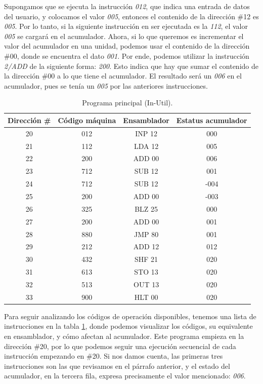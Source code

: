 \documentclass[letterpaper,12pt,oneside]{book}
\begin{document}
    Supongamos que se ejecuta la instrucción  \textit{012}, que indica una entrada de datos del usuario, y colocamos el valor \textit{005}, entonces
    el contenido de la dirección
	\#12 es \textit{005}. Por lo tanto, si la siguiente instrucción en ser ejecutada es la \textit{112}, el valor \textit{005} se cargará en el acumulador. 
	Ahora, si lo que queremos es incrementar el valor
	del acumulador en una unidad, podemos usar el contenido de la dirección \#00, donde se encuentra el dato \textit{001}.
	Por ende, podemos utilizar la instrucción \textit{2/ADD} de la siguiente forma: \textit{200}. Esto indica que hay que sumar el contenido de la 
	dirección \#00 a lo que tiene
	el acumulador. El resultado será un \textit{006} en el acumulador, pues se tenía un \textit{005} por las anteriores instrucciones.
	
	\begin{table}[h]
	  \centering
	  \begin{tabular}{|c|c|c|c|}
	    \hline
    	\textbf{Dirección \#} & \textbf{Código máquina} & \textbf{Ensamblador} & \textbf{Estatus acumulador} \\
	    \hline
	     20 & 012 & INP 12 & 000 \\
	     21 & 112 & LDA 12 & 005\\
	     22 & 200 & ADD 00 & 006\\
	     23 & 712 & SUB 12 & 001\\
	     24 & 712 & SUB 12 & -004\\
	     25 & 200 & ADD 00 & -003\\
	     26 & 325 & BLZ 25 & 000\\
	     27 & 200 & ADD 00 & 001\\
	     28 & 880 & JMP 80 & 001\\
	     29 & 212 & ADD 12 & 012\\
	     30 & 432 & SHF 21 & 020\\
	     31 & 613 & STO 13 & 020\\
	     32 & 513 & OUT 13 & 020\\
	     33 & 900 & HLT 00 & 020\\
	    \hline
	  \end{tabular}
	  \caption{Programa principal (In-Util). }
	  \label{tab:Programa_Principal}
	\end{table}
	
	Para seguir analizando los códigos de operación disponibles, tenemos una lista de instrucciones en la tabla \ref{tab:Programa_Principal}, donde
	podemos visualizar los códigos, su equivalente en ensamblador, y cómo afectan al acumulador. Este programa empieza en la
	dirección \#20, por lo que podemos seguir una ejecución secuencial de cada instrucción empezando en \#20.
	Si nos damos cuenta, las primeras tres instrucciones son las que revisamos en el párrafo anterior, y el
	estado del acumulador, en la tercera fila, expresa precisamente el valor mencionado: \textit{006}.
\end{document}
